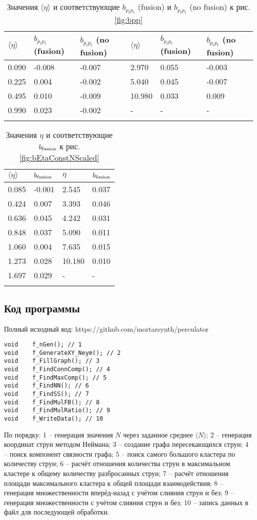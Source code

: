 {\footnotesize
\begin{longtable}{| l | l | l || l | l | l |}
	\hline
	$\langle \eta \rangle$	&	$b_{p_tp_t}$ (fusion)	&	$b_{p_tp_t}$ (no fusion)	&	$\langle \eta \rangle$	&	$b_{p_tp_t}$ (fusion)	&	$b_{p_tp_t}$ (no fusion)	\\
	\hline
	0.090	&	-0.008	&	-0.007	&	2.970	&	0.055	&	-0.003	\\
	0.225	&	0.004	&	-0.002	&	5.040	&	0.045	&	-0.007	\\
	0.495	&	0.010	&	-0.009	&	10.980	&	0.033	&	0.009	\\
	0.990	&	0.023	&	-0.002	&	-		&	-		&		-	\\
	\hline
	\caption{Значения $\langle \eta \rangle$ и соответствующие $b_{p_tp_t}$ (fusion) и $b_{p_tp_t}$ (no fusion) к рис. \ref{fig:bpp}} \label{tab:bnn}
\end{longtable}}



{\footnotesize
\begin{longtable}{| l | l || l | l |}
	\hline
	$\langle \eta \rangle$	&	$b_{\textnormal{fusion}}$	&	$\eta$	&	$b_{\textnormal{fusion}}$	\\
	\hline
	0.085	&	-0.001	&	2.545	&	0.037	\\
	0.424	&	0.007	&	3.393	&	0.046	\\
	0.636	&	0.045	&	4.242	&	0.031	\\
	0.848	&	0.037	&	5.090	&	0.011	\\
	1.060	&	0.004	&	7.635	&	0.015	\\
	1.273	&	0.028	&	10.180	&	0.010	\\
	1.697	&	0.029	&	-		&	-	\\
	\hline
	\caption{Значения $\eta$ и соответствующие $b_{\textnormal{fusion}}$ к рис. \ref{fig:bEtaConstNScaled}} \label{tab:bEtaConstN}
\end{longtable}}
\newpage
\subsection{Код программы}
Полный исходный код: https://github.com/mortarsynth/perculator
\begin{lstlisting}
void	f_nGen(); // 1
void	f_GenerateXY_Neym(); // 2
void	f_FillGraph(); // 3
void	f_FindConnComp(); // 4
void	f_FindMaxComp(); // 5
void	f_FindNN(); // 6
void	f_FindSS(); // 7
void	f_FindMulFB(); // 8
void	f_FindMulRatio(); // 9
void	f_WriteData(); // 10
\end{lstlisting}
По порядку:  1 -- генерация значения $N$ через заданное среднее $\langle N \rangle$; 2 -- генерация координат струн методом Неймана; 3 -- создание графа пересекающихся струн; 4 -- поиск компонент связности графа; 5 -- поиск самого большого кластера по количеству струн; 6 -- расчёт отношения количества струн в максимальном кластере к общему количеству разбросанных струн; 7 -- расчёт отношения площади максимального кластера к общей площади взаимодействия; 8 -- генерация множественности вперёд-назад с учётом слияния струн и без; 9 -- генерация множественности с учётом слияния струн и без; 10 -- запись данных в файл для последующей обработки.

